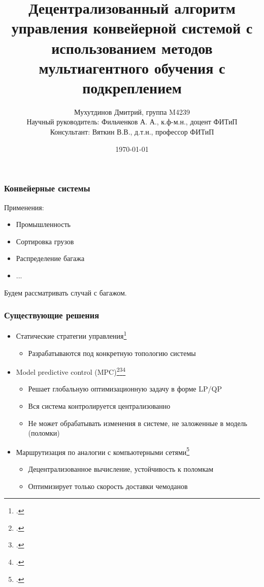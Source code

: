 \documentclass{beamer}
\title[GGRN-routing]{
  Децентрализованный алгоритм управления конвейерной системой
  с использованием методов мультиагентного обучения с подкреплением
}
\author[Дмитрий Мухутдинов, М4239]{
  Мухутдинов Дмитрий, группа M4239 \\
  Научный руководитель: Фильченков А. А., к.ф-м.н., доцент ФИТиП \\
  Консультант: Вяткин В.В., д.т.н., профессор ФИТиП
}%
\institute[ИТМО] %
{
  Факультет Информационных Технологий и Программирования \\
  Мегафакультет Трансляционных Информационных Технологий \\
  Университет ИТМО, Санкт-Петербург
}
\date{\today} %
\begin{document}
\frame{\titlepage}


\begin{frame}
  \frametitle{Конвейерные системы}
  Применения:
  \begin{itemize}
  \item Промышленность
  \item Сортировка грузов
  \item Распределение багажа
  \item ...
  \end{itemize}
  Будем рассматривать случай с багажом.
\end{frame}


\begin{frame}
  \frametitle{Существующие решения}
  \begin{itemize}
  \item Статические стратегии управления\footcite{de1994baggage}
    \begin{itemize}
    \item Разрабатываются под конкретную топологию системы
    \end{itemize}
  \item Model predictive control (MPC)\footcite{cataldo2016dynamic}\footcite{zeinaly2015integrated}\footcite{luo2015energy}
    \begin{itemize}
    \item Решает глобальную оптимизационную задачу в форме LP/QP
    \item Вся система контролируется централизованно
    \item Не может обрабатывать изменения в системе, не заложенные в модель (поломки)
    \end{itemize}
  \item Маршрутизация по аналогии с компьютерными сетями\footcite{vyatkin-controllers}
    \begin{itemize}
    \item Децентрализованное вычисление, устойчивость к поломкам
    \item Оптимизирует только скорость доставки чемоданов
    \end{itemize}
  \end{itemize}
\end{frame}
\end{document}
